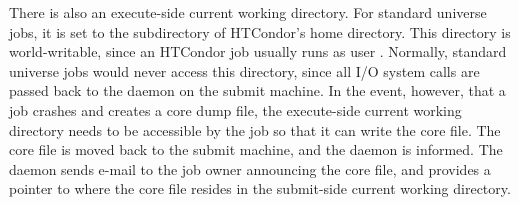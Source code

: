 There is also an execute-side current working directory.
For standard universe jobs,
it is set to the
 subdirectory of HTCondor's home directory.
This directory is world-writable, since an HTCondor job usually runs as user
.
Normally, standard universe jobs would never access this directory,
since all I/O system calls are passed back to the
 daemon on the submit machine.
In the event, however,
that a job crashes and creates a core dump file, the execute-side
current working directory needs to be accessible by the job
so that it can write the core file.
The core file is moved back to the submit machine,
and the  daemon is informed.
The  daemon
sends e-mail to the job owner announcing the core file, and provides a
pointer to where
the core file resides in the submit-side current working directory.



%

